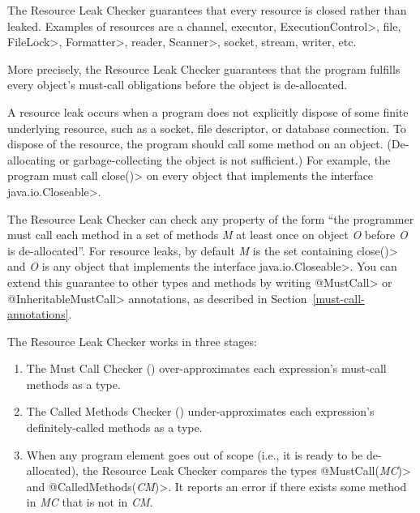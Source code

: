 
The Resource Leak Checker guarantees that every resource is closed rather
than leaked.  Examples of resources are a channel, executor,
\<ExecutionControl>, file, \<FileLock>, \<Formatter>, reader,
\<Scanner>, socket, stream, writer, etc.

More precisely, the Resource Leak Checker guarantees that the program
fulfills every object's must-call obligations before the object is
de-allocated.

A resource leak occurs when a program does not explicitly dispose of some finite
underlying resource, such as a socket, file descriptor, or database connection.  To dispose
of the resource, the program should call some method on an object.
(De-allocating or garbage-collecting the object is not sufficient.)  For
example, the program must call \<close()> on every object that implements the
interface \<java.io.Closeable>.

The Resource Leak Checker can check any property of the form ``the programmer
must call each method in a set of methods \emph{M} at least once
on object \emph{O} before \emph{O} is de-allocated''.  For resource leaks,
by default \emph{M} is the set containing
\<close()> and \emph{O} is any object that implements the interface
\<java.io.Closeable>.  You can extend this guarantee to other types and methods
by writing \<@MustCall> or \<@InheritableMustCall> annotations, as described in
Section~\ref{must-call-annotations}.

The Resource Leak Checker works in three stages:
\begin{enumerate}
\item The Must Call Checker ()
  over-approximates each expression's must-call methods as a
   type.
\item The Called Methods Checker ()
  under-approximates each expression's definitely-called methods as a
   type.
\item When any program element goes out of scope (i.e., it is ready to be
  de-allocated), the Resource Leak Checker compares the types
  \<@MustCall(\emph{MC})> and \<@CalledMethods(\emph{CM})>.  It reports an error
  if there exists some method in \emph{MC} that is not in \emph{CM}.
\end{enumerate}


